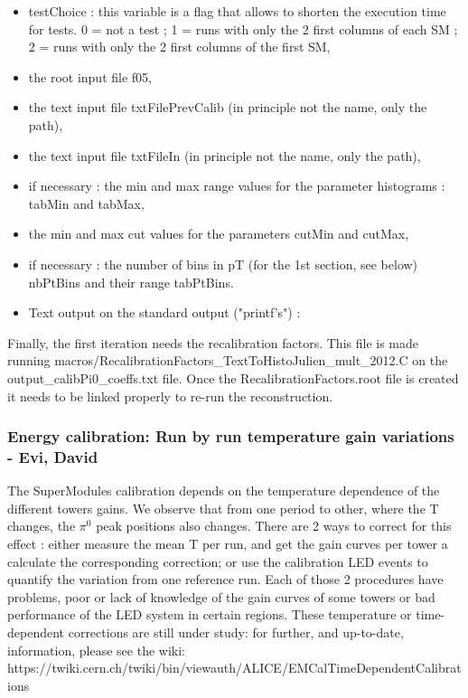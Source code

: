 \begin{itemize}
\item testChoice : this variable is a flag that allows to shorten the execution time for tests. 0 = not a test ; 1 = runs with only the 2 first columns of each SM ; 2 = runs with only the 2 first columns of the first SM,
\item the root input file f05,
\item the text input file txtFilePrevCalib (in principle not the name, only the path),
\item the text input file txtFileIn (in principle not the name, only the path),
\item if necessary : the min and max range values for the parameter histograms : tabMin and tabMax,
\item the min and max cut values for the parameters cutMin and cutMax,
\item if necessary : the number of bins in pT (for the 1st section, see below) nbPtBins and their range tabPtBins.
\item Text output on the standard output ("printf's") :
\end{itemize}

Finally, the first iteration needs the recalibration factors. This file is made running macros/RecalibrationFactors\_TextToHistoJulien\_mult\_2012.C on the output\_calibPi0\_coeffs.txt file. Once the RecalibrationFactors.root file is created it needs to be linked properly to re-run the reconstruction.


\subsubsection{Energy calibration: Run by run temperature gain variations - Evi, David  }

The SuperModules calibration depends on the temperature dependence of the different towers gains. We observe that from one period to other, where the T changes, the $\pi^{0}$ peak positions also changes. There are 2 ways to correct for this effect : either measure the mean T per run, and get the gain curves per tower a calculate the corresponding correction; or use the calibration LED events to quantify the variation from one reference run. Each of those 2 procedures have problems, poor or lack of knowledge of the gain curves of some towers or bad performance of the LED system in certain regions.
These temperature or time-dependent corrections are still under study: for further, and up-to-date, information, please see the wiki: 
https://twiki.cern.ch/twiki/bin/viewauth/ALICE/EMCalTimeDependentCalibrations


